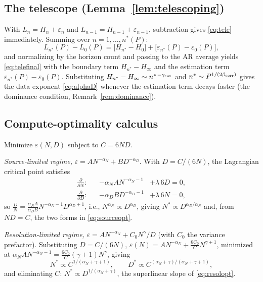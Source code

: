 \documentclass[12pt]{article}
\newcommand{\eps}{\varepsilon}
\theoremstyle{remark}
\begin{document}
\subsection{The telescope (Lemma~\ref{lem:telescoping})}
\label{app:telescoping}
With $L_n=H_n+\eps_n$ and $L_{n-1}=H_{n-1}+\eps_{n-1}$, subtraction gives
\eqref{eq:tele} immediately. Summing over $n=1,\dots,n^*(P)$:
\begin{equation*}
  L_{n^*}(P)-L_0(P)
  =\bigl[H_{n^*}-H_0\bigr]+\bigl[\eps_{n^*}(P)-\eps_0(P)\bigr],
\end{equation*}
and normalizing by the horizon count and passing to the AR average yields
\eqref{eq:telefinal} with the boundary term $H_{n^*}-H_\infty$ and the
estimation term $\eps_{n^*}(P)-\eps_0(P)$. Substituting
$H_{n^*}-H_\infty\sim n^{*\,-\gamma_{\rm ent}}$ and
$n^*\sim P^{1/(2\beta_{\rm corr})}$ gives the data exponent
\eqref{eq:alphaD} whenever the estimation term decays faster (the dominance
condition, Remark~\ref{rem:dominance}).

\subsection{Compute-optimality calculus}
\label{app:compute}
Minimize $\eps(N,D)$ subject to $C=6ND$.

\emph{Source-limited regime,} $\eps=A N^{-\alpha_N}+B D^{-\alpha_D}$. With
$D=C/(6N)$, the Lagrangian critical point satisfies
\begin{align*}
  \frac{\partial}{\partial N}:&&
  -\alpha_N A N^{-\alpha_N-1} &+ \lambda\,6D =0,\\
  \frac{\partial}{\partial D}:&&
  -\alpha_D B D^{-\alpha_D-1} &+ \lambda\,6N =0,
\end{align*}
so $\frac{D}{N}=\frac{\alpha_N A}{\alpha_D B}N^{-\alpha_N-1}D^{\alpha_D+1}$,
i.e., $N^{\alpha_N}\propto D^{\alpha_D}$, giving
$N^*\propto D^{\alpha_D/\alpha_N}$ and, from $ND=C$, the two forms in
\eqref{eq:sourceopt}.

\emph{Resolution-limited regime,} $\eps=A N^{-\alpha_N}+C_0 N^{\gamma}/D$
(with $C_0$ the variance prefactor). Substituting $D=C/(6N)$,
$\eps(N)=A N^{-\alpha_N}+\frac{6C_0}{C}N^{\gamma+1}$, minimized at
$\alpha_N A N^{-\alpha_N-1}=\frac{6C_0}{C}(\gamma+1)N^{\gamma}$, giving
\begin{equation*}
  N^*\propto C^{1/(\alpha_N+\gamma+1)},\qquad
  D^*\propto C^{(\alpha_N+\gamma)/(\alpha_N+\gamma+1)},
\end{equation*}
and eliminating $C$: $N^*\propto D^{1/(\alpha_N+\gamma)}$, the superlinear
slope of \eqref{eq:resolopt}.
\end{document}
